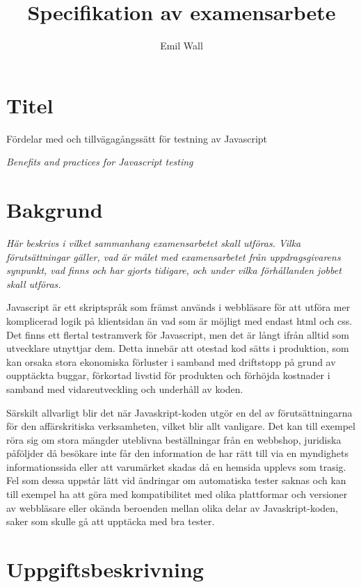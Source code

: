 \documentclass[11pt]{article}
\title{Specifikation av examensarbete}
\author{Emil Wall}
\begin{document}
\maketitle

\vspace{10mm}

\section{Titel}

Fördelar med och tillvägagångssätt för testning av Javascript

\textit{\foreignlanguage{english}{Benefits and practices for Javascript testing}}

\section{Bakgrund}

\textit{Här beskrivs i vilket sammanhang examensarbetet skall utföras. Vilka förutsättningar gäller, vad är målet med examensarbetet från uppdragsgivarens synpunkt, vad finns och har gjorts tidigare, och under vilka förhållanden jobbet skall utföras.}

Javascript är ett skriptspråk som främst används i webbläsare för att utföra mer komplicerad logik på klientsidan än vad som är möjligt med endast html och css. Det finns ett flertal testramverk för Javascript, men det är långt ifrån alltid som utvecklare utnyttjar dem. Detta innebär att otestad kod sätts i produktion, som kan orsaka stora ekonomiska förluster i samband med driftstopp på grund av oupptäckta buggar, förkortad livstid för produkten och förhöjda kostnader i samband med vidareutveckling och underhåll av koden.

Särskilt allvarligt blir det när Javaskript-koden utgör en del av förutsättningarna för den affärskritiska verksamheten, vilket blir allt vanligare. Det kan till exempel röra sig om stora mängder uteblivna beställningar från en webbshop, juridiska påföljder då besökare inte får den information de har rätt till via en myndighets informationssida eller att varumärket skadas då en hemsida upplevs som trasig. Fel som dessa uppstår lätt vid ändringar om automatiska tester saknas och kan till exempel ha att göra med kompatibilitet med olika plattformar och versioner av webbläsare eller okända beroenden mellan olika delar av Javaskript-koden, saker som skulle gå att upptäcka med bra tester.

\section{Uppgiftsbeskrivning}
\end{document}
